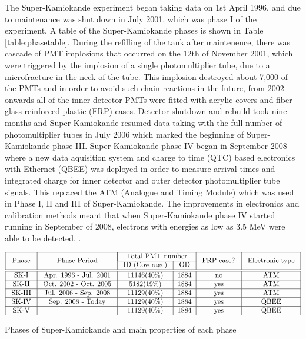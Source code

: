The Super-Kamiokande experiment began taking data on 1st April 1996, and due to maintenance was shut down in July 2001, which was phase I of the experiment. A table of the Super-Kamiokande phases is shown in Table \ref{table:phasetable}. During the refilling of the tank after maintenence, there was cascade of PMT implosions that occurred on the 12th of November 2001, which were triggered by the implosion of a single photomultiplier tube, due to a microfracture in the neck of the tube. This implosion destroyed about 7,000 of the PMTs and in order to avoid such chain reactions in the future, from 2002 onwards all of the inner detector PMTs were fitted with acrylic covers and fiber-glass reinforced plastic (FRP) cases. Detector shutdown and rebuild took nine months and Super-Kamiokande resumed data taking with the full number of photomultiplier tubes in July 2006 which marked the beginning of Super-Kamiokande phase III. Super-Kamiokande phase IV began in September 2008 where a new data aquisition system and charge to time (QTC) based electronics with Ethernet (QBEE) was deployed in order to measure arrival times and integrated charge for inner detector and outer detector photomultiplier tube signals. This replaced the ATM (Analogue and Timing Module) which was used in Phase I, II and III of Super-Kamiokande. The improvements in electronics and calibration methods meant that when Super-Kamiokande phase IV started running in September of 2008, electrons with energies as low as 3.5 MeV were able to be detected. \cite{fernandezmenendezNeutrinoPhysicsPresent2018}.

\begin{table}[htp]
    \centering
    $$
\begin{array}{|c|c|c|c|c|c|}
    \hline \multirow{2}{*}{\text { Phase }} & \multirow{2}{*}{\text { Phase Period }} & \multicolumn{2}{|c|}{\text { Total PMT number  }} & \multirow{2}{*}{\text { FRP case? }} & \multirow{2}{*}{\text { Electronic type }} \tabularnewline
    \cline {3-4} & &  \text { ID (Coverage) } & \text { OD } & & \tabularnewline
    \hline \hline \text { SK-I } & \text { Apr. 1996 - Jul. 2001 } & 11146(40 \%) & 1884 & \text { no } & \text { ATM } \\
    \hline \text { SK-II } & \text { Oct. 2002 - Oct. 2005 } & 5182(19 \%) & 1884 & \text { yes } & \text { ATM } \\
    \hline \text { SK-III } & \text { Jul. 2006 - Sep. 2008 } & 11129(40 \%) & 1884 & \text { yes } & \text { ATM } \\
    \hline \text { SK-IV } & \text { Sep. 2008 - Today } & 11129(40 \%) & 1884 & \text { yes } & \text { QBEE } \\
    \hline \text {SK-V}    &  \text{} &  11129(40 \%) & 1884 & \text { yes } & \text { QBEE } \\
\end{array}
    $$
\caption{Phases of Super-Kamiokande and main properties of each phase }
\label{table:phasetable}
\end{table}




